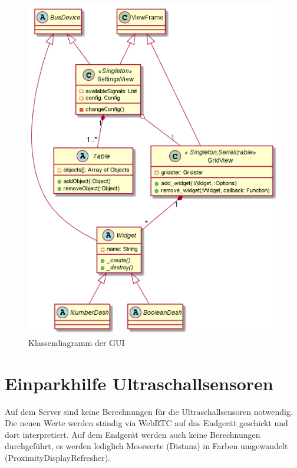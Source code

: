 \documentclass[entwurf.tex]{subfiles}
\begin{document}
		\begin{figure}[H]
  			\begin{center}
 				\includegraphics[width=\textwidth]{diagrams/UI.png}
  				\caption{Klassendiagramm der GUI}
  			\end{center}
  		\end{figure}
  	
		\newpage
		\section{Einparkhilfe Ultraschallsensoren}
		Auf dem Server sind keine Berechnungen für die Ultraschallsensoren notwendig. Die neuen Werte werden ständig via WebRTC auf das Endgerät geschickt und dort interpretiert. Auf dem Endgerät werden auch keine Berechnungen durchgeführt, es werden lediglich Messwerte (Distanz) in Farben umgewandelt (ProximityDisplayRefresher).
\end{document}
